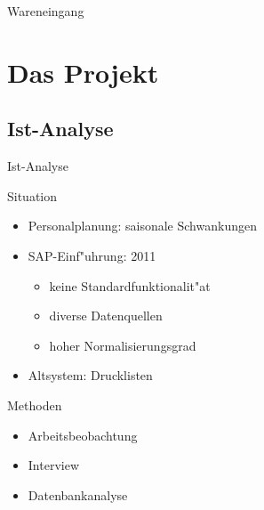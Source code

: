 \begin{frame}{Wareneingang}
\begin{overlayarea}{\textwidth}{.42\textheight}
 \end{overlayarea}
 \begin{overlayarea}{\textwidth}{.58\textheight}
 \end{overlayarea}
\end{frame}

\section{Das Projekt}
\subsection{Ist-Analyse}
\begin{frame}[<+->]{Ist-Analyse}
	\begin{block}{Situation}
		\begin{itemize}[<+->]
			\item Personalplanung: saisonale Schwankungen
			\item{SAP-Einf"uhrung: 2011
			\begin{itemize}
				\item keine Standardfunktionalit"at
				\item diverse Datenquellen
				\item hoher Normalisierungsgrad
			\end{itemize}
			}
			\item Altsystem: Drucklisten
		\end{itemize}
	\end{block}
	\begin{block}{Methoden}
		\begin{itemize}[<+->]
			\item Arbeitsbeobachtung
			\item Interview
			\item Datenbankanalyse
		\end{itemize}
	\end{block}
\end{frame}


